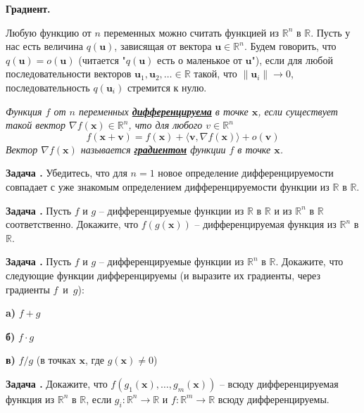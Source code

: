 \documentclass[12pt,a4paper]{article}
\def\R{\mathbb{R}}
\newcounter{znum}
\newcommand{\zz}[1]{\addtocounter{znum}{1} \textbf{Задача \arabic{znum}#1. }}
\begin{document}
\pagestyle{empty}

\begin{center} \Large \textbf{Градиент.}
\end{center}

Любую функцию от $n$ переменных можно считать функцией из $\R^n$ в $\R$. 
Пусть у нас есть величина $q(\mathbf{u})$, зависящая от вектора $\mathbf{u} \in \R^n$. Будем говорить, что $q(\mathbf{u}) = o(\mathbf{u})$ (читается "$q(\mathbf{u})$ есть о маленькое от $\mathbf{u}$"), если для любой последовательности векторов $\mathbf{u}_1, \mathbf{u}_2, \ldots \in \R$ такой, что $\|\mathbf{u}_i\| \to 0$, последовательность $q(\mathbf{u}_i)$ стремится к нулю.


{\it Функция $f$ от $n$ переменных \textbf{\href{https://ru.wikipedia.org/wiki/\%D0\%94\%D0\%B8\%D1\%84\%D1\%84\%D0\%B5\%D1\%80\%D0\%B5\%D0\%BD\%D1\%86\%D0\%B8\%D1\%80\%D1\%83\%D0\%B5\%D0\%BC\%D0\%B0\%D1\%8F_\%D1\%84\%D1\%83\%D0\%BD\%D0\%BA\%D1\%86\%D0\%B8\%D1\%8F\#\%D0\%A4\%D1\%83\%D0\%BD\%D0\%BA\%D1\%86\%D0\%B8\%D0\%B8_\%D0\%BD\%D0\%B5\%D1\%81\%D0\%BA\%D0\%BE\%D0\%BB\%D1\%8C\%D0\%BA\%D0\%B8\%D1\%85_\%D0\%BF\%D0\%B5\%D1\%80\%D0\%B5\%D0\%BC\%D0\%B5\%D0\%BD\%D0\%BD\%D1\%8B\%D1\%85}{дифференцируема}} в точке $\mathbf{x}$, если существует такой вектор $\nabla f(\mathbf{x}) \in \R^n$, что для любого $v \in \R^n$
$$ f(\mathbf{x} + \mathbf{v}) = f(\mathbf{x}) + \langle \mathbf{v}, \nabla f(\mathbf{x}) \rangle + o(\mathbf{v})$$
Вектор $\nabla f(\mathbf{x})$ называется \textbf{\href{https://ru.wikipedia.org/wiki/\%D0\%93\%D1\%80\%D0\%B0\%D0\%B4\%D0\%B8\%D0\%B5\%D0\%BD\%D1\%82}{градиентом}} функции $f$ в точке $\mathbf{x}$.
}

\zz{} Убедитесь, что для $n=1$ новое определение дифференцируемости совпадает с уже знакомым определением дифференцируемости функции из $\R$ в $\R$.

\zz{} Пусть $f$ и $g$ -- дифференцируемые функции из $\R$ в $\R$ и из $\R^n$ в $\R$ соответственно. Докажите, что $f(g(\mathbf{x}))$ -- дифференцируемая функция из $\R^n$  в $\R$.

\zz{} Пусть $f$ и $g$ -- дифференцируемые функции из $\R^n$ в $\R$. Докажите, что следующие функции дифференцируемы (и выразите их градиенты, через градиенты $f$~и~$g$):\par
\textbf{a)} $f + g$ \par
\textbf{б)} $f \cdot g$ \par
\textbf{в)} $f / g$ (в точках $\mathbf{x}$, где $g(\mathbf{x}) \ne 0$)

\zz{} Докажите, что $f(g_1(\mathbf{x}), \ldots, g_m(\mathbf{x}))$ -- всюду дифференцируемая функция из $\R^n$ в $\R$, если $g_i: \R^n \to \R$ и $f: \R^m \to \R$ всюду дифференцируемы.
\end{document}
